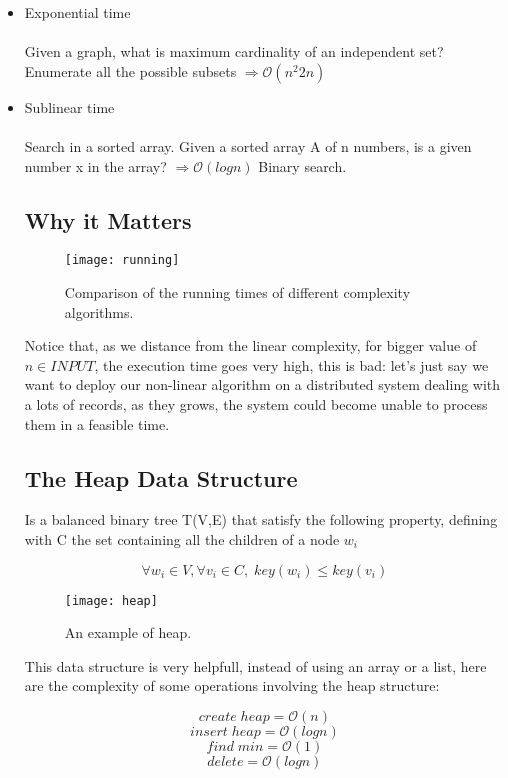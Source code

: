 \begin{itemize}
    \item {Exponential time}\\\\
          Given a graph, what is maximum cardinality of an independent set? Enumerate all the possible subsets $\Rightarrow \mathcal{O}{(n^{2} 2n)}$

    \item {Sublinear time}\\\\
          Search in a sorted array. Given a sorted array A of n numbers, is a given number x in the array? $ \Rightarrow \mathcal{O}{(logn)}$ Binary search.

          \subsection{Why it Matters}

          \begin{figure}[H]
              \centering
              \texttt{[image: running]}
              \caption{Comparison of the running times of different complexity algorithms.}
          \end{figure}

          Notice that, as we distance from the linear complexity, for bigger value of $n \in INPUT$, the execution time goes very high, this is bad: let's just say we want to deploy our non-linear algorithm on a distributed system dealing with a lots of records, as they grows, the system could become unable to process them in a feasible time.

          \subsection{The Heap Data Structure}

          Is a balanced binary tree  T(V,E) that satisfy the following property, defining with C the set containing all the children of a node $w_{i}$

          \[ \forall w_{i} \in V, \forall v_{i} \in C, \; key(w_{i}) \leq key(v_{i})\]

          \begin{figure}[H]
              \centering
              \texttt{[image: heap]}
              \caption{An example of heap.}
          \end{figure}

          This data structure is very helpfull, instead of using an array or a list, here are the complexity of some operations involving the heap structure:

          \[ create \; heap =  \mathcal{O}{(n)}\]
          \[ insert \; heap =  \mathcal{O}{(logn)}\]
          \[find \; min =  \mathcal{O}{(1)}\]
          \[delete  =  \mathcal{O}{(logn)}\]

\end{itemize}

\clearpage

